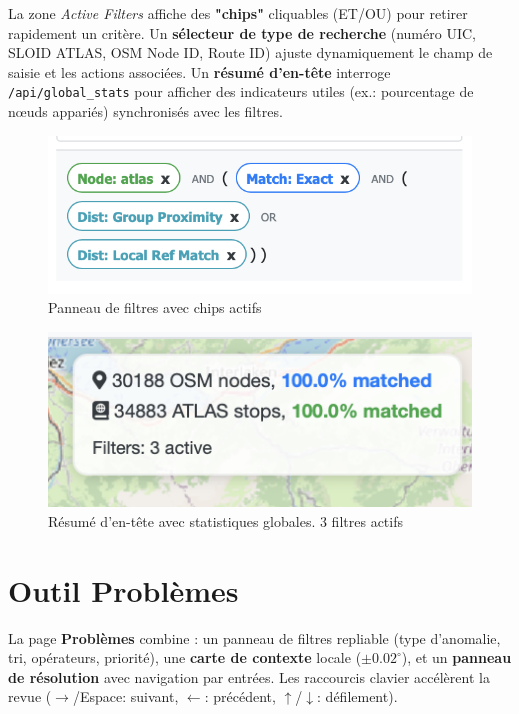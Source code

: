 La zone \textit{Active Filters} affiche des \textbf{"chips"} cliquables (ET/OU) pour retirer rapidement un critère. Un \textbf{sélecteur de type de recherche} (numéro UIC, SLOID ATLAS, OSM Node ID, Route ID) ajuste dynamiquement le champ de saisie et les actions associées. Un \textbf{résumé d'en-tête} interroge \texttt{/api/global\_stats} pour afficher des indicateurs utiles (ex.: pourcentage de nœuds appariés) synchronisés avec les filtres.

\begin{figure}[h]
  \centering
  \includegraphics[width=\textwidth]{../figures/chap9/filter_chips_index.png}
  \caption[Filtres — chips actifs]{Panneau de filtres avec \og chips \fg{} actifs}
  \label{fig:frontend-filters-chips}
\end{figure}

\begin{figure}[h]
  \centering
  \includegraphics[width=\textwidth]{../figures/chap9/stats box.png}
  \caption[Résumé d'en-tête]{Résumé d'en-tête avec statistiques globales. 3 filtres actifs}
  \label{fig:frontend-filters}
\end{figure}

\section{Outil Problèmes}

La page \textbf{Problèmes} combine : un panneau de filtres repliable (type d'anomalie, tri, opérateurs, priorité), une \textbf{carte de contexte} locale (\(\pm 0.02^\circ\)), et un \textbf{panneau de résolution} avec navigation par entrées. Les raccourcis clavier accélèrent la revue (\(\rightarrow\)/Espace: suivant, \(\leftarrow\): précédent, \(\uparrow\)/\(\downarrow\): défilement).

